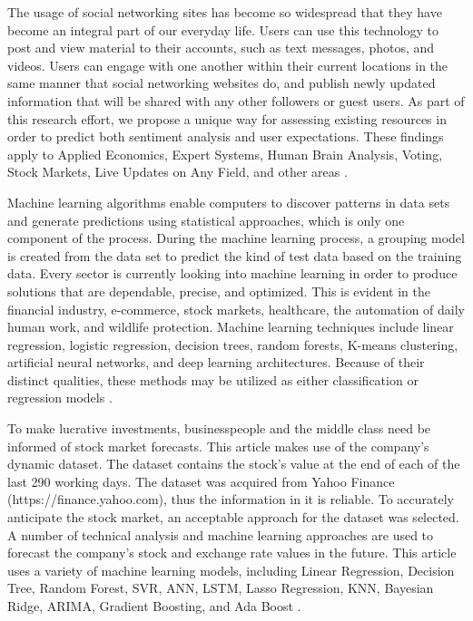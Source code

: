 The usage of social networking sites has become so widespread that they have become an integral part of our everyday life. Users can use this technology to post and view material to their accounts, such as text messages, photos, and videos. Users can engage with one another within their current locations in the same manner that social networking websites do, and publish newly updated information that will be shared with any other followers or guest users. As part of this research effort, we propose a unique way for assessing existing resources in order to predict both sentiment analysis and user expectations. These findings apply to Applied Economics, Expert Systems, Human Brain Analysis, Voting, Stock Markets, Live Updates on Any Field, and other areas \citep{ramesh2020artificial}.

Machine learning algorithms enable computers to discover patterns in data sets and generate predictions using statistical approaches, which is only one component of the process. During the machine learning process, a grouping model is created from the data set to predict the kind of test data based on the training data. Every sector is currently looking into machine learning in order to produce solutions that are dependable, precise, and optimized. This is evident in the financial industry, e-commerce, stock markets, healthcare, the automation of daily human work, and wildlife protection. Machine learning techniques include linear regression, logistic regression, decision trees, random forests, K-means clustering, artificial neural networks, and deep learning architectures. Because of their distinct qualities, these methods may be utilized as either classification or regression models \citep{ponnam2016comparative}.

To make lucrative investments, businesspeople and the middle class need be informed of stock market forecasts. This article makes use of the company's dynamic dataset. The dataset contains the stock's value at the end of each of the last 290 working days. The dataset was acquired from Yahoo Finance (https://finance.yahoo.com), thus the information in it is reliable. To accurately anticipate the stock market, an acceptable approach for the dataset was selected. A number of technical analysis and machine learning approaches are used to forecast the company's stock and exchange rate values in the future. This article uses a variety of machine learning models, including Linear Regression, Decision Tree, Random Forest, SVR, ANN, LSTM, Lasso Regression, KNN, Bayesian Ridge, ARIMA, Gradient Boosting, and Ada Boost \citep{yasmin2022stock}.

